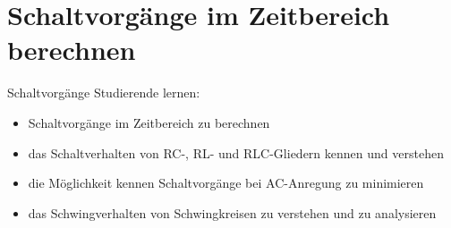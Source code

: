 
\section[Berechnung im Zeitbereich]{Schaltvorgänge im Zeitbereich berechnen}
\label{sec:schaltvorgaengezeitbereich}
\begin{frame}\ftx{\secname}
%
    \begin{Lernziele}{Schaltvorgänge}
        Studierende lernen:
        \begin{itemize}\b{\setlength\itemsep{0.7em}}
            \item Schaltvorgänge im Zeitbereich zu berechnen %
            \item das Schaltverhalten von RC-, RL- und RLC-Gliedern kennen und verstehen %
            \item die Möglichkeit kennen Schaltvorgänge bei AC-Anregung zu minimieren%
            \item das Schwingverhalten von Schwingkreisen zu verstehen und zu analysieren %
        \end{itemize}
    \end{Lernziele}
\end{frame}


